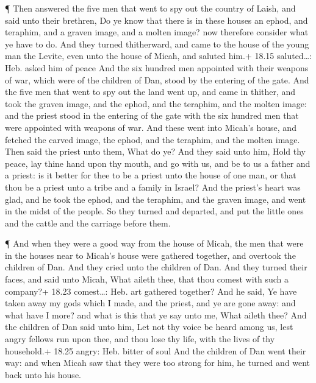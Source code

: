  ¶ Then answered the five men that went to spy out the
country of Laish, and said unto their brethren, Do ye know that there is
in these houses an ephod, and teraphim, and a graven image, and a molten
image? now therefore consider what ye have to do.  And they
turned thitherward, and came to the house of the young man the Levite,
even unto the house of Micah, and saluted him.+ 18.15 saluted\ldots:
Heb. asked him of peace  And the six hundred men appointed
with their weapons of war, which were of the children of Dan, stood by
the entering of the gate.  And the five men that went to
spy out the land went up, and came in thither, and took the graven
image, and the ephod, and the teraphim, and the molten image: and the
priest stood in the entering of the gate with the six hundred men that
were appointed with weapons of war.  And these went into
Micah's house, and fetched the carved image, the ephod, and the
teraphim, and the molten image. Then said the priest unto them, What do
ye?  And they said unto him, Hold thy peace, lay thine hand
upon thy mouth, and go with us, and be to us a father and a priest: is
it better for thee to be a priest unto the house of one man, or that
thou be a priest unto a tribe and a family in Israel?  And
the priest's heart was glad, and he took the ephod, and the teraphim,
and the graven image, and went in the midst of the people. 
So they turned and departed, and put the little ones and the cattle and
the carriage before them.

 ¶ And when they were a good way from the house of Micah,
the men that were in the houses near to Micah's house were gathered
together, and overtook the children of Dan.  And they cried
unto the children of Dan. And they turned their faces, and said unto
Micah, What aileth thee, that thou comest with such a company?+ 18.23
comest\ldots: Heb. art gathered together?  And he said, Ye
have taken away my gods which I made, and the priest, and ye are gone
away: and what have I more? and what is this that ye say unto me, What
aileth thee?  And the children of Dan said unto him, Let
not thy voice be heard among us, lest angry fellows run upon thee, and
thou lose thy life, with the lives of thy household.+ 18.25 angry: Heb.
bitter of soul  And the children of Dan went their way: and
when Micah saw that they were too strong for him, he turned and went
back unto his house.

